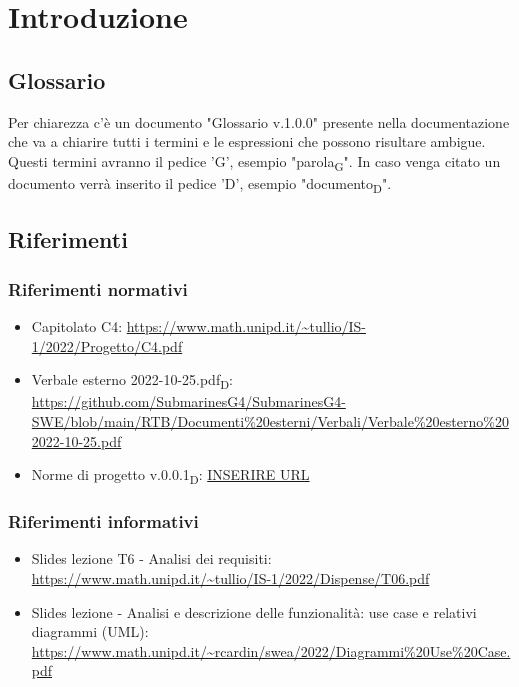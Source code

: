 \section{Introduzione}
\subsection{Glossario}
Per chiarezza c'è un documento "Glossario v.1.0.0" presente nella documentazione che va a chiarire tutti i termini e le espressioni che possono risultare ambigue. Questi termini avranno il pedice 'G', esempio "parola\textsubscript G".
In caso venga citato un documento verrà inserito il pedice 'D', esempio "documento\textsubscript D".
\subsection{Riferimenti}
\subsubsection{Riferimenti normativi}
\begin{itemize}
    \item Capitolato C4: \url{https://www.math.unipd.it/~tullio/IS-1/2022/Progetto/C4.pdf}
    \item Verbale esterno 2022-10-25.pdf\textsubscript D: \url{https://github.com/SubmarinesG4/SubmarinesG4-SWE/blob/main/RTB/Documenti%20esterni/Verbali/Verbale%20esterno%202022-10-25.pdf}
    \item Norme di progetto v.0.0.1\textsubscript D: \url{INSERIRE URL}
\end{itemize}

\subsubsection{Riferimenti informativi}
\begin{itemize}
    \item Slides lezione T6 - Analisi dei requisiti: \url{https://www.math.unipd.it/~tullio/IS-1/2022/Dispense/T06.pdf}
    \item Slides lezione    - Analisi e descrizione delle funzionalità: use case e relativi diagrammi (UML): \url{https://www.math.unipd.it/~rcardin/swea/2022/Diagrammi%20Use%20Case.pdf}
\end{itemize}